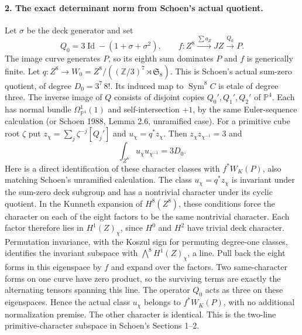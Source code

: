 \paragraph{2. The exact determinant norm from Schoen's actual quotient.}
Let $\sigma$ be the deck generator and set
\[
 Q_0=3\operatorname{Id}-(1+\sigma+\sigma^2),\qquad
 f:Z^8\xrightarrow{\sum a_Z}JZ\xrightarrow{Q_0}P.
 \tag{F1S14.4}
\]
The image curve generates $P$, so its eighth sum dominates $P$ and $f$
is generically finite. Let
$q:Z^8\to W_0=Z^8/((\mathbb Z/3)^7\rtimes\mathfrak S_8)$.
This is Schoen's actual sum-zero quotient, of degree
$D_0=3^7\,8!$. Its induced map to $\operatorname{Sym}^8C$ is etale of
degree three. The inverse image of $Q$ consists of disjoint copies
$Q_0',Q_1',Q_2'$ of $\mathbb P^4$. Each has normal bundle
$\Omega^1_{\mathbb P^4}(1)$ and self-intersection $+1$, by the same
Euler-sequence calculation (or Schoen 1988, Lemma 2.6, unramified case).
For a primitive cube root $\zeta$ put
$z_\chi=\sum_j\zeta^{-j}[Q_j']$ and $u_\chi=q^*z_\chi$.
Then $z_\chi z_{\chi^{-1}}=3$ and
\[
                  \int_{Z^8}u_\chi u_{\chi^{-1}}=3D_0.
 \tag{F1S14.5}
\]
Here is a direct identification of these character classes with
$f^*W_K(P)$, also matching Schoen's unramified calculation. The class
$u_\chi=q^*z_\chi$ is invariant under the sum-zero deck subgroup and
has a nontrivial character under its cyclic quotient. In the Kunneth
expansion of $H^8(Z^8)$, these conditions force the character on each
of the eight factors to be the same nontrivial character. Each factor
therefore lies in $H^1(Z)_\chi$, since $H^0$ and $H^2$ have trivial
deck character. Permutation invariance, with the Koszul sign for
permuting degree-one classes, identifies the invariant subspace with
$\bigwedge^8H^1(Z)_\chi$, a line. Pull back the eight forms in this
eigenspace by $f$ and expand over the factors. Two same-character
forms on one curve have zero product, so the surviving terms are
exactly the alternating tensors spanning this line. The operator
$Q_0$ acts as three on these eigenspaces. Hence the actual class
$u_\chi$ belongs to $f^*W_K(P)$, with no additional normalization
premise. The other character is identical. This is the two-line
primitive-character subspace in Schoen's Sections 1--2.

